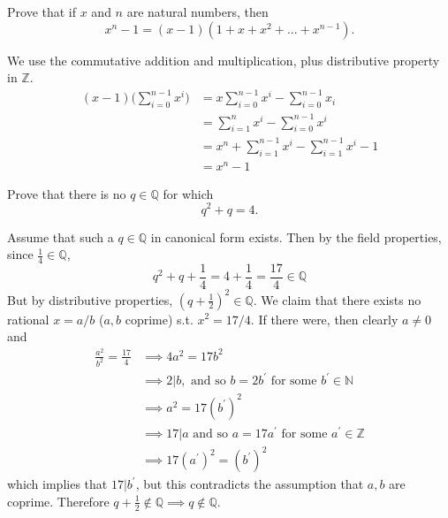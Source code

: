   \begin{exercise}
    Prove that if $x$ and $n$ are natural numbers, then
    \begin{equation}
      x^n - 1 = (x-1)(1 + x + x^2 + ... + x^{n-1}).
    \end{equation}
  \end{exercise}
  \begin{solution}
    We use the commutative addition and multiplication, plus distributive property in $\mathbb{Z}$. 
    \begin{align}
      (x - 1) \bigg( \sum_{i=0}^{n-1} x^i \bigg) & = x \sum_{i=0}^{n-1} x^i - \sum_{i=0}^{n-1} x_i \\
                                                 & = \sum_{i=1}^n x^i - \sum_{i=0}^{n-1} x^i \\
                                                 & = x^n + \sum_{i=1}^{n-1} x^i - \sum_{i=1}^{n-1} x^i - 1 \\
                                                 & = x^n - 1
    \end{align}
  \end{solution}

  \begin{exercise}
    Prove that there is no $q \in \mathbb{Q}$ for which
    \begin{equation}
      q^2 + q = 4.
    \end{equation}
  \end{exercise}
  \begin{solution}
    Assume that such a $q \in \mathbb{Q}$ in canonical form exists. Then by the field properties, since $\frac{1}{4} \in \mathbb{Q}$, 
    \begin{equation}
      q^2 + q + \frac{1}{4} = 4 + \frac{1}{4} = \frac{17}{4} \in \mathbb{Q}
    \end{equation}
    But by distributive properties, $(q + \frac{1}{2})^2 \in \mathbb{Q}$. We claim that there exists no rational $x = a/b$ ($a, b$ coprime) s.t. $x^2 = 17/4$. If there were, then clearly $a \neq 0$ and 
    \begin{align}
      \frac{a^2}{b^2} = \frac{17}{4} & \implies 4a^2 = 17 b^2 \\
                                     & \implies 2 | b, \text{ and so } b = 2b^\prime \text{ for some } b^\prime \in \mathbb{N} \\
                                     & \implies a^2 = 17 (b^\prime)^2 \\ 
                                     & \implies 17 | a \text{ and so } a = 17 a^\prime \text{ for some } a^\prime \in \mathbb{Z} \\
                                     & \implies 17 (a^\prime)^2 = (b^\prime)^2
    \end{align}
    which implies that $17|b^\prime$, but this contradicts the assumption that $a, b$ are coprime. Therefore $q + \frac{1}{2} \not\in \mathbb{Q} \implies q \not\in \mathbb{Q}$. 
  \end{solution}

